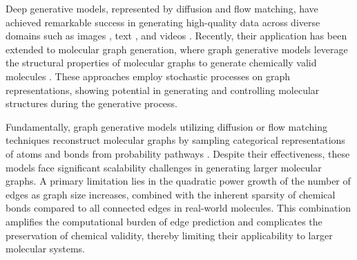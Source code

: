 


\color{black}

Deep generative models, represented by diffusion and flow matching, have achieved remarkable success in generating high-quality data across diverse domains such as images \citep{glide_image, ldm, ddpm}, text \citep{diffusion_lm}, and videos \citep{videocontrolnet, vdm}.
Recently, their application has been extended to molecular graph generation, where graph generative models leverage the structural properties of molecular graphs to generate chemically valid molecules \citep{gdss, digress, defog}. 
These approaches employ stochastic processes on graph representations, showing potential in generating and controlling molecular structures during the generative process.

Fundamentally, graph generative models utilizing diffusion or flow matching techniques reconstruct molecular graphs by sampling categorical representations of atoms and bonds from probability pathways \citep{digress, defog}.
Despite their effectiveness, these models face significant scalability challenges in generating larger molecular graphs.
A primary limitation lies in the quadratic power growth of the number of edges as graph size increases, combined with the inherent sparsity of chemical bonds compared to all connected edges in real-world molecules.
This combination amplifies the computational burden of edge prediction and complicates the preservation of chemical validity, thereby limiting their applicability to larger molecular systems.


